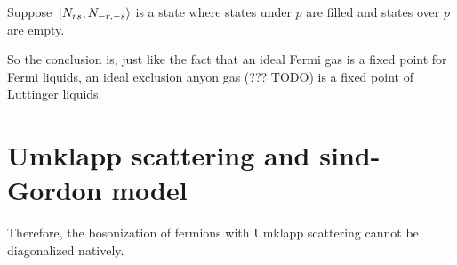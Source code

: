 \documentclass[hyperref, a4paper]{article}
\begin{document}
Suppose $\ket*{N_{rs}, N_{-r, -s}}$ is a state where states under $p$ are filled and states over $p$ are empty.

So the conclusion is, just like the fact that an ideal Fermi gas is a fixed point for Fermi liquids, an ideal 
exclusion anyon gas (??? TODO) is a fixed point of Luttinger liquids. 

\section{Umklapp scattering and sind-Gordon model}

Therefore, the bosonization of fermions with Umklapp scattering cannot be diagonalized natively.



\end{document}
